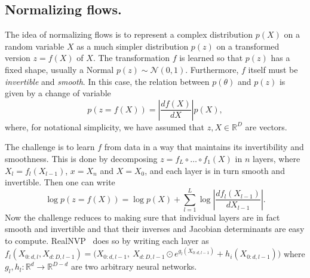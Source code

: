 \subsection{Normalizing flows.}


The idea of normalizing flows is to represent a complex distribution $p(X)$ on a random variable $X$ as a much simpler distribution $p(z)$ on a transformed version $z=f(X)$ of $X$.
The transformation $f$ is learned so that $p(z)$ has a fixed shape, usually a Normal $p(z) \sim \mathcal{N}(0,1)$.
Furthermore, $f$ itself must be \emph{invertible} and \emph{smooth}.
In this case, the relation between $p(\theta)$ and $p(z)$ is given by a change of variable
$$
 p(z = f(X)) =  \left| \frac{df(X)}{dX} \right| p(X),
$$
where, for notational simplicity, we have assumed that $z,X\in\mathbb{R}^D$ are vectors.

The challenge is to learn $f$ from data in a way that maintains its invertibility and smoothness.
This is done by decomposing $z = f_L \circ \dots \circ f_1 (X)$ in $n$ layers, where $X_l = f_l(X_{l-1})$, $x = X_n$ and $X=X_0$, and each layer is in turn smooth and invertible.
Then one can write
$$
 \log p(z = f(X)) =
 \log p(X) + \sum_{l=1}^L \log \left| \frac{df_l(X_{l-1})}{dX_{l-1}} \right|.
$$
Now the challenge reduces to making sure that individual layers are in fact smooth and invertible and that their inverses and Jacobian determinants are easy to compute.
RealNVP~\cite{dinh17density} does so by writing each layer as $f_l(X_{0:d,l}, X_{d:D,l-1}) = \big(X_{0:d,l-1},~ X_{d:D,l-1} \odot e^{g_l(X_{0:d,l-1})} + h_i(X_{0:d,l-1})\big)$ where $g_l,h_l:\mathbb{R}^d \rightarrow \mathbb{R}^{D-d}$ are two arbitrary neural networks.
